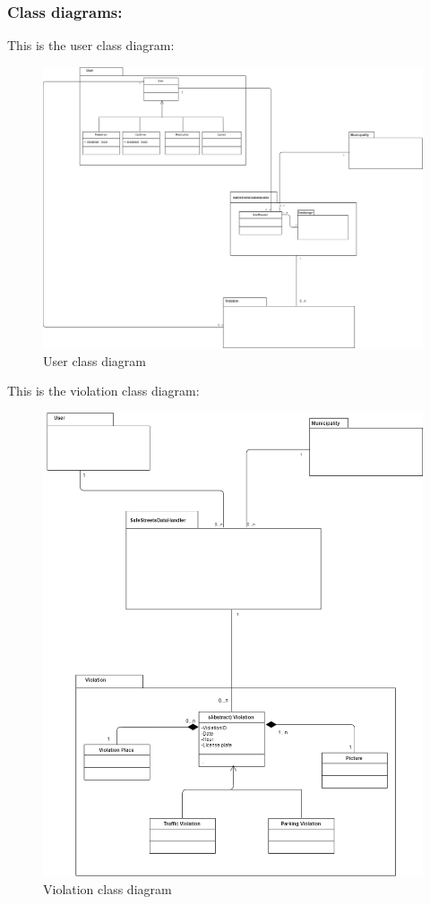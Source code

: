 \documentclass[titlepage]{article}
\begin{document}
\subsubsection{Class diagrams:}
This is the user class diagram:
\begin{figure}[h
]
	\includegraphics[scale=0.3]{UML users v1.0.png}
	\centering
	\caption{User class diagram}
\end{figure}
\FloatBarrier


This is the violation class diagram:
\begin{figure}[h
]
	\includegraphics[scale=0.3]{UML violation v1.1.png}
	\centering
	\caption{Violation class diagram}
\end{figure}
\FloatBarrier
\end{document}
